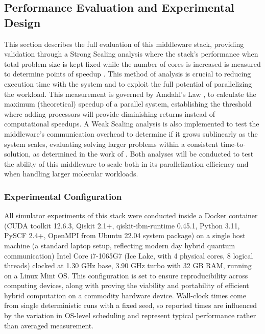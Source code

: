 \subsection{Performance Evaluation and Experimental Design}
This section describes the full evaluation of this middleware stack, providing validation through a Strong Scaling analysis where the  
stack's performance when total problem size is kept fixed while the number of cores is increased is measured to determine points of speedup \parencite{cuboulderScaling} . This method of 
analysis is crucial to reducing execution time with the system and to exploit the full potential of parallelizing the workload. This measurement is governed by Amdahl's Law \parencite{amdahl1967validity}, 
to calculate the maximum (theoretical) speedup of a parallel system, establishing the threshold where adding processors will provide diminishing returns instead of computational speedups. 
A Weak Scaling analysis is also implemented to test the middleware's communication overhead to determine if it grows sublinearly as the system scales, evaluating solving larger problems within a consistent 
time-to-solution, as determined in the work of \textcite{gustafson1988reevaluating}. Both analyses will be conducted to test the ability of this middleware to scale both in 
its parallelization efficiency and when handling larger molecular workloads. 

\subsubsection{Experimental Configuration}  
All simulator experiments of this stack were conducted inside a Docker container (CUDA toolkit 12.6.3, Qiskit 2.1+, qiskit-ibm-runtime 0.45.1, Python 3.11, PySCF 2.4+, OpenMPI from Ubuntu 22.04 system package) 
on a single host machine (a standard laptop setup, reflecting modern day hybrid quantum communication) Intel Core i7-1065G7 (Ice Lake, with 4 physical cores, 8 logical threads) clocked at 1.30 GHz base, 3.90 GHz turbo with 32 GB RAM, 
running on a Linux Mint OS. This configuration is set to ensure reproducibility across computing devices, along with proving the viability and portability of efficient hybrid computation on a commodity hardware device. 
Wall-clock times come from single deterministic runs with a fixed seed, so reported times are influenced by the variation in OS-level scheduling and represent typical performance rather than averaged measurement. 

